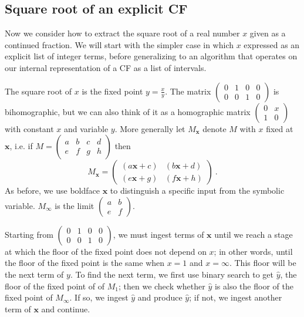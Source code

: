 \documentclass[11pt, oneside]{amsart}   	%
\newcommand{\abcd}{\left(
\begin{smallmatrix} 
a & b & c & d\\ 
e & f & g & h
\end{smallmatrix}
\right)}
\begin{document}
\subsection{Square root of an explicit CF}
Now we consider how to extract the square root of a real number $x$ given as a continued fraction. We will start 
with the simpler case in which $x$ expressed as an explicit list of integer terms, before generalizing to an algorithm that
operates on our internal representation of a CF as a list of intervals.

The square root of $x$ is the fixed point $y = \frac{x}{y}$. The matrix $\left(
\begin{smallmatrix} 
0 & 1 & 0 & 0\\ 
0 & 0 & 1 & 0
\end{smallmatrix}
\right)$
is bihomographic, but we can also think of it as a homographic
matrix $\left(
\begin{smallmatrix} 
0 & x \\ 
1 & 0 
\end{smallmatrix}
\right)$ with constant $x$ and variable $y$. More generally let $M_{\mathbf{x}}$ denote $M$ with $x$ fixed at $\mathbf{x}$,
i.e. if $M=\abcd$ then
\[
M_{\mathbf{x}} = \begin{pmatrix}
                                (a\mathbf{x}+c) & (b\mathbf{x}+d)\\
                                (e\mathbf{x}+g) & (f\mathbf{x}+h)
                                \end{pmatrix}\ .
\]
As before, we use boldface $\mathbf{x}$ to distinguish a specific input from the symbolic variable. $M_{\infty}$ is the limit $\left(
\begin{smallmatrix} 
a & b \\ 
e & f 
\end{smallmatrix}
\right)$.

Starting from $\left(
\begin{smallmatrix} 
0 & 1 & 0 & 0\\ 
0 & 0 & 1 & 0
\end{smallmatrix}
\right)$, we must ingest terms of $\mathbf{x}$ until we reach a stage at which the floor of the fixed point does not depend on $x$;
in other words, until the floor of the fixed point is the same when $x=1$ and $x=\infty$. This floor will be the next term of $y$.
To find the next term, we first use binary search to get $\hat{y}$, the floor of the fixed point of of $M_1$; 
then we check whether $\hat{y}$ is also the floor of the fixed point of  $M_{\infty}$. If so, we ingest
$\hat{y}$ and produce $\hat{y}$; if not, we ingest another term of $\mathbf{x}$ and continue.
\end{document}
